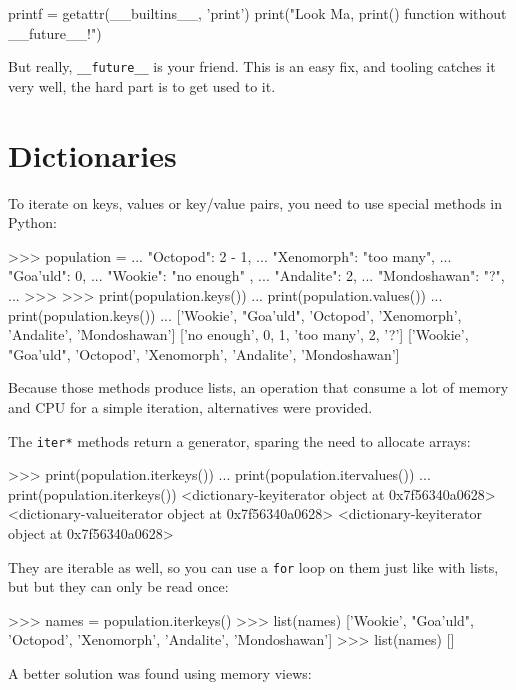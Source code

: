 \begin{py2and3}
printf = getattr(__builtins__, 'print')
print("Look Ma, print() function without __future__!")
\end{py2and3}

But really, \lstinline{__future__} is your friend. This is an easy fix, and tooling catches it very well, the hard part is to get used to it.


\section{Dictionaries}

To iterate on keys, values or key/value pairs, you need to use special methods in Python:

\begin{py2}
>>> population = {
...     "Octopod": 2 - 1,
...     "Xenomorph": "too many",
...     "Goa'uld": 0,
...     "Wookie": "no enough" ,
...     "Andalite": 2,
...     "Mondoshawan": "?",
... }
>>>
>>> print(population.keys())
... print(population.values())
... print(population.keys())
...
['Wookie', "Goa'uld", 'Octopod', 'Xenomorph', 'Andalite', 'Mondoshawan']
['no enough', 0, 1, 'too many', 2, '?']
['Wookie', "Goa'uld", 'Octopod', 'Xenomorph', 'Andalite', 'Mondoshawan']
\end{py2}

Because those methods produce lists, an operation that consume a lot of memory and CPU for a simple iteration, alternatives were provided.

The \lstinline{iter*} methods return a generator, sparing the need to allocate arrays:

\begin{py2}
>>> print(population.iterkeys())
... print(population.itervalues())
... print(population.iterkeys())
<dictionary-keyiterator object at 0x7f56340a0628>
<dictionary-valueiterator object at 0x7f56340a0628>
<dictionary-keyiterator object at 0x7f56340a0628>
\end{py2}

They are \gls{iterable} as well, so you can use a \lstinline{for} loop on them just like with lists, but but they can only be read once:

\begin{py2}
>>> names = population.iterkeys()
>>> list(names)
['Wookie', "Goa'uld", 'Octopod', 'Xenomorph', 'Andalite', 'Mondoshawan']
>>> list(names)
[]
\end{py2}

A better solution was found using memory views:

